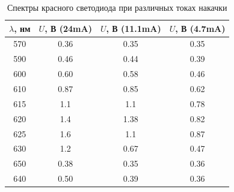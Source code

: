 \documentclass[a4paper, 12pt]{extarticle}
\begin{document}
\begin{table}[h]
    \centering
    
    \begin{tabular}{|c|c|c|c|}
        \hline
        $\lambda$, нм & $U$, В (24mA) & $U$, В (11.1mA) & $U$, В (4.7mA) \\
        \hline
        570 & 0.36 & 0.35 & 0.35 \\
        590 & 0.46 & 0.44 & 0.39 \\
        600 & 0.60 & 0.58 & 0.46 \\
        610 & 0.87 & 0.85 & 0.62 \\
        615 & 1.1 & 1.1 & 0.78 \\
        620 & 1.4 & 1.38 & 0.82 \\
        625 & 1.6 & 1.1 & 0.87 \\
        630 & 1.2 & 0.67 & 0.47 \\
        650 & 0.38 & 0.35 & 0.36 \\
        640 & 0.50 & 0.39 & 0.36 \\
        \hline
    \end{tabular}
    \caption{Спектры красного светодиода при различных токах накачки}
\end{table}
\end{document}
